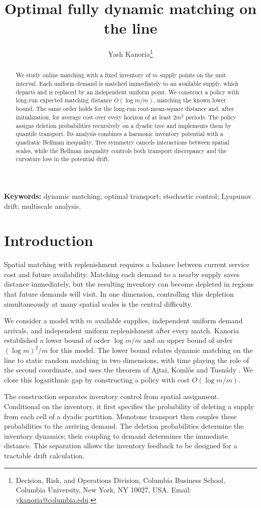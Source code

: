 \documentclass[11pt]{article}
\title{Optimal fully dynamic matching on the line}
\author{}
\author{Yash Kanoria\thanks{Decision, Risk, and Operations Division,
  Columbia Business School, Columbia University, New York, NY 10027, USA.
  Email: \href{mailto:ykanoria@columbia.edu}{ykanoria@columbia.edu}.}}
\date{}
\numberwithin{equation}{section}
\theoremstyle{remark}
\begin{document}
\maketitle
\begin{abstract}
We study online matching with a fixed inventory of \(m\) supply points on
the unit interval. Each uniform demand is matched immediately to an
available supply, which departs and is replaced by an independent uniform
point. We construct a policy with long-run expected matching distance
\(O(\log m/m)\), matching the known lower bound. The same order holds for
the long-run root-mean-square distance and, after initialization, for average cost
over every horizon of at least \(2m^2\) periods. The policy assigns deletion
probabilities recursively on a dyadic tree and implements them by quantile
transport. Its analysis combines a harmonic inventory potential with a
quadratic Bellman inequality. Tree symmetry cancels interactions between
spatial scales, while the Bellman inequality controls both transport
discrepancy and the curvature loss in the potential drift.
\end{abstract}
\noindent\textbf{Keywords:} dynamic matching; optimal transport; stochastic
control; Lyapunov drift; multiscale analysis.

\section{Introduction}

Spatial matching with replenishment requires a balance between current
service cost and future availability. Matching each demand to a nearby
supply saves distance immediately, but the resulting inventory can become
depleted in regions that future demands will visit. In one dimension,
controlling this depletion simultaneously at many spatial scales is the
central difficulty.

We consider a model with \(m\) available supplies, independent uniform
demand arrivals, and independent uniform replenishment after every match.
Kanoria \cite{Kanoria} established a lower bound of order \(\log m/m\)
and an upper bound of order \((\log m)^2/m\) for this model. The lower
bound relates dynamic matching on the line to static random matching in
two dimensions, with time playing the role of the second coordinate, and
uses the theorem of Ajtai, Koml\'os and Tusn\'ady \cite{AKT}. We close
this logarithmic gap by constructing a policy with cost \(O(\log m/m)\).

The construction separates inventory control from spatial assignment.
Conditional on the inventory, it first specifies the probability of
deleting a supply from each cell of a dyadic partition. Monotone transport
then couples these probabilities to the arriving demand. The deletion
probabilities determine the inventory dynamics; their coupling to demand
determines the immediate distance. This separation allows the inventory
feedback to be designed for a tractable drift calculation.
\end{document}
